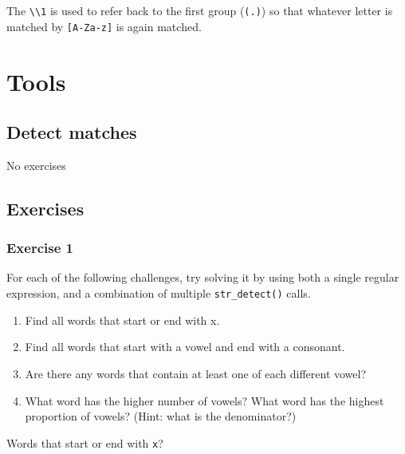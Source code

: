 \documentclass[]{book}
\newenvironment{Shaded}{\begin{snugshade}}{\end{snugshade}}
\newcommand{\CommentTok}[1]{\textcolor[rgb]{0.56,0.35,0.01}{\textit{#1}}}
\newcommand{\KeywordTok}[1]{\textcolor[rgb]{0.13,0.29,0.53}{\textbf{#1}}}
\newcommand{\NormalTok}[1]{#1}
\newcommand{\OperatorTok}[1]{\textcolor[rgb]{0.81,0.36,0.00}{\textbf{#1}}}
\newcommand{\StringTok}[1]{\textcolor[rgb]{0.31,0.60,0.02}{#1}}
\providecommand{\tightlist}{%
  \setlength{\itemsep}{0pt}\setlength{\parskip}{0pt}}
\theoremstyle{plain}
\theoremstyle{remark}
\theoremstyle{definition}
\theoremstyle{definition}
\theoremstyle{definition}
\theoremstyle{remark}
\begin{document}
The \texttt{\textbackslash{}\textbackslash{}1} is used to refer back to
the first group (\texttt{(.)}) so that whatever letter is matched by
\texttt{{[}A-Za-z{]}} is again matched.

\hypertarget{tools}{%
\section{Tools}\label{tools}}

\hypertarget{detect-matches}{%
\subsection{Detect matches}\label{detect-matches}}

No exercises

\hypertarget{exercises-1}{%
\subsection{Exercises}\label{exercises-1}}

\hypertarget{exercise-1-36}{%
\subsubsection{Exercise 1}\label{exercise-1-36}}

For each of the following challenges, try solving it by using both a
single regular expression, and a combination of multiple
\texttt{str\_detect()} calls.

\begin{enumerate}
\def\labelenumi{\arabic{enumi}.}
\tightlist
\item
  Find all words that start or end with x.
\item
  Find all words that start with a vowel and end with a consonant.
\item
  Are there any words that contain at least one of each different vowel?
\item
  What word has the higher number of vowels? What word has the highest
  proportion of vowels? (Hint: what is the denominator?)
\end{enumerate}

Words that start or end with \texttt{x}?

\begin{Shaded}
\end{Shaded}
\end{document}
